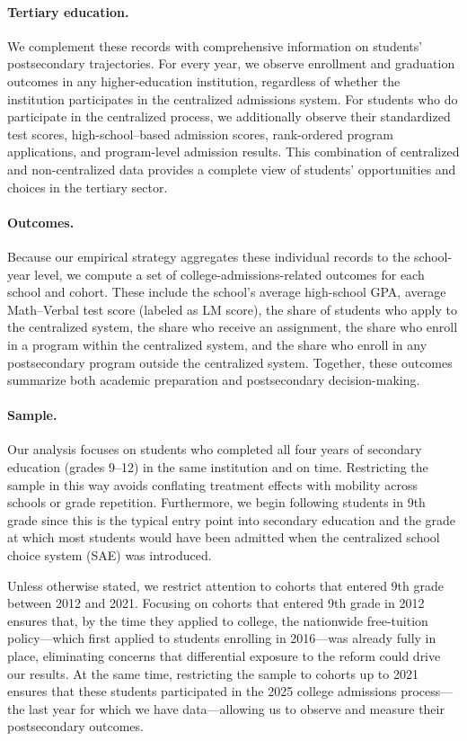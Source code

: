 \documentclass[11pt]{article}
\begin{document}
\paragraph{Tertiary education.} 
We complement these records with comprehensive information on students' postsecondary trajectories. For every year, we observe enrollment and graduation outcomes in any higher-education institution, regardless of whether the institution participates in the centralized admissions system. For students who do participate in the centralized process, we additionally observe their standardized test scores, high-school–based admission scores, rank-ordered program applications, and program-level admission results. This combination of centralized and non-centralized data provides a complete view of students' opportunities and choices in the tertiary sector.

\paragraph{Outcomes.} 
Because our empirical strategy aggregates these individual records to the school-year level, we compute a set of college-admissions-related outcomes for each school and cohort. These include the school's average high-school GPA, average Math–Verbal test score (labeled as LM score), the share of students who apply to the centralized system, the share who receive an assignment, the share who enroll in a program within the centralized system, and the share who enroll in any postsecondary program outside the centralized system. Together, these outcomes summarize both academic preparation and postsecondary decision-making.

\paragraph{Sample.} 
Our analysis focuses on students who completed all four years of secondary education (grades 9--12) in the same institution and on time. Restricting the sample in this way avoids conflating treatment effects with mobility across schools or grade repetition. Furthermore, we begin following students in 9th grade since this is the typical entry point into secondary education and the grade at which most students would have been admitted when the centralized school choice system (SAE) was introduced. 

Unless otherwise stated, we restrict attention to cohorts that entered 9th grade between 2012 and 2021. Focusing on cohorts that entered 9th grade in 2012 ensures that, by the time they applied to college, the nationwide free-tuition policy---which first applied to students enrolling in 2016---was already fully in place, eliminating concerns that differential exposure to the reform could drive our results. At the same time, restricting the sample to cohorts up to 2021 ensures that these students participated in the 2025 college admissions process---the last year for which we have data---allowing us to observe and measure their postsecondary outcomes.
\end{document}
